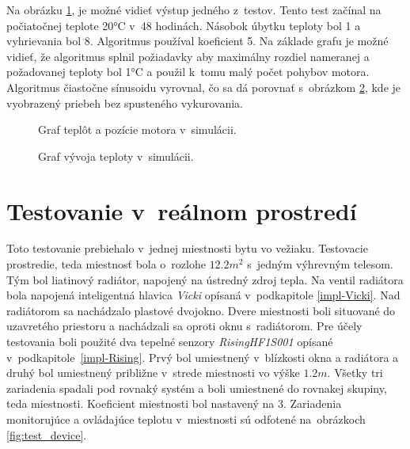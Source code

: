 Na obrázku \ref{fig:simGraph}, je možné vidieť výstup jedného z~testov. 
Tento test začínal na počiatočnej teplote 20°C v~48 hodinách. 
Násobok úbytku teploty bol 1 a vyhrievania bol 8. 
Algoritmus používal koeficient 5. 
Na základe grafu je možné vidieť, že algoritmus splnil požiadavky aby maximálny rozdiel nameranej a požadovanej teploty bol 1°C a použil k~tomu malý počet pohybov motora. 
Algoritmus čiastočne sínusoidu vyrovnal, čo sa dá porovnať s~obrázkom \ref{fig:simGraphNoHeating}, kde je vyobrazený priebeh bez spusteného vykurovania.

\begin{figure}[H]
    \centering
    
    \caption{Graf teplôt a pozície motora v~simulácii.}
    \label{fig:simGraph}
\end{figure}

\begin{figure}[H]
    \centering
    
    \caption{Graf vývoja teploty v~simulácii.}
    \label{fig:simGraphNoHeating}
\end{figure}



\section{Testovanie v~reálnom prostredí}\label{test-real}
Toto testovanie prebiehalo v~jednej miestnosti bytu vo vežiaku. 
Testovacie prostredie, teda miestnosť bola o~rozlohe $12.2 m^2$ s~jedným výhrevným telesom. 
Tým bol liatinový radiátor, napojený na ústredný zdroj tepla. 
Na ventil radiátora bola napojená inteligentná hlavica \emph{Vicki} opísaná v~podkapitole \ref{impl-Vicki}. 
Nad radiátorom sa nachádzalo plastové dvojokno. 
Dvere miestnosti boli situované do uzavretého priestoru a nachádzali sa oproti oknu s~radiátorom. 
Pre účely testovania boli použité dva tepelné senzory \emph{RisingHF1S001} opísané v~podkapitole~\ref{impl-Rising}. 
Prvý bol umiestnený v~blízkosti okna a radiátora a druhý bol umiestnený približne v~strede miestnosti vo výške $1.2 m$.
Všetky tri zariadenia spadali pod rovnaký systém a boli umiestnené do rovnakej skupiny, teda miestnosti.
Koeficient miestnosti bol nastavený na 3.
Zariadenia monitorujúce a ovládajúce teplotu v~miestnosti sú odfotené na~obrázkoch \ref{fig:test_device}.

